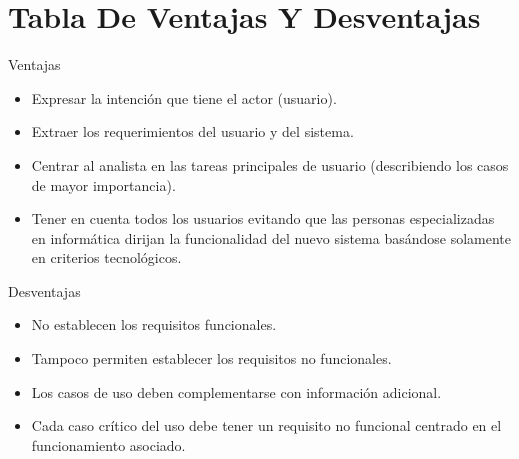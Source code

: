 \documentclass[12pt]{article}
\begin{document}
\section{Tabla De Ventajas Y Desventajas}
\label{sec:orgf013e3b}
\begin{minipage}[t]{0.48\linewidth}
Ventajas
\begin{itemize}
\item Expresar la intención que tiene el actor (usuario).
\item Extraer los requerimientos del usuario y del sistema.
\item Centrar al analista en las tareas principales de usuario (describiendo los casos de mayor importancia).
\item Tener en cuenta todos los usuarios evitando que las personas especializadas en informática dirijan la funcionalidad del nuevo sistema basándose solamente en criterios tecnológicos.
\end{itemize}
\end{minipage}
\begin{minipage}[t]{0.48\linewidth}
Desventajas
\begin{itemize}
\item No establecen los requisitos funcionales.
\item Tampoco permiten establecer los requisitos no funcionales.
\item Los casos de uso deben complementarse con información adicional.
\item Cada caso crítico del uso debe tener un requisito no funcional centrado en el funcionamiento asociado.
\end{itemize}
\end{minipage}
\end{document}
